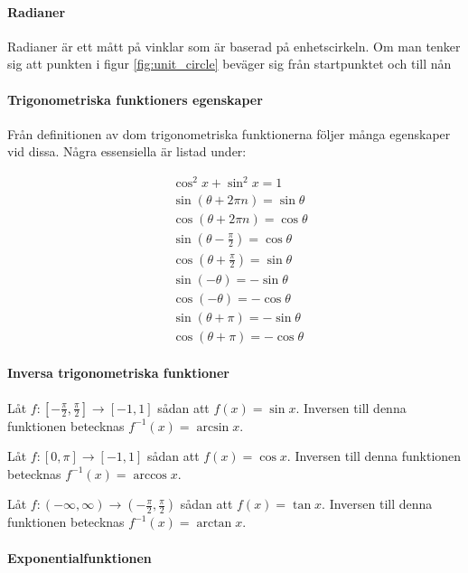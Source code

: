 \paragraph{Radianer}

Radianer är ett mått på vinklar som är baserad på enhetscirkeln. Om man tenker sig att punkten i figur \ref{fig:unit_circle} beväger sig från startpunktet och till nån 

\paragraph{Trigonometriska funktioners egenskaper}

Från definitionen av dom trigonometriska funktionerna följer många egenskaper vid dissa. Några essensiella är listad under:

\begin{align*}
	&\cos^2x + \sin^2x = 1\\
	&\sin\left(\theta + 2\pi n\right) = \sin\theta\\
	&\cos\left(\theta + 2\pi n\right) = \cos\theta\\
	&\sin\left(\theta - \frac{\pi}{2}\right) = \cos\theta\\
	&\cos\left(\theta + \frac{\pi}{2}\right) = \sin\theta\\
	&\sin\left(-\theta\right) = -\sin\theta\\
	&\cos\left(-\theta\right) = -\cos\theta\\
	&\sin\left(\theta+\pi\right) = -\sin\theta\\
	&\cos\left(\theta+\pi\right) = -\cos\theta
\end{align*}

\paragraph{Inversa trigonometriska funktioner}

Låt $f:\left[-\frac{\pi}{2},\frac{\pi}{2}\right]\to [-1,1]$ sådan att $f(x)=\sin x$. Inversen till denna funktionen betecknas $f^{-1}(x)=\arcsin x$.

Låt $f:[0,\pi]\to [-1,1]$ sådan att $f(x)=\cos x$. Inversen till denna funktionen betecknas $f^{-1}(x)=\arccos x$.

Låt $f:(-\infty,\infty)\to \left(-\frac{\pi}{2},\frac{\pi}{2}\right)$ sådan att $f(x)=\tan x$. Inversen till denna funktionen betecknas $f^{-1}(x)=\arctan x$.

\paragraph{Exponentialfunktionen}

